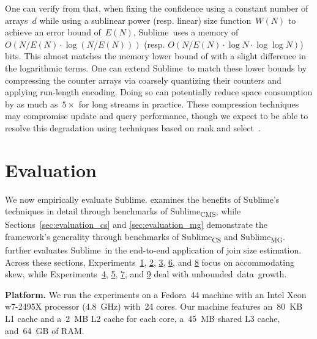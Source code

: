 \documentclass[sigconf]{acmart}
\newcommand{\sketch}{Sublime}
\newcommand{\sketchcms}{\sketch\textsubscript{CMS}\xspace}
\newcommand{\sketchcs}{\sketch\textsubscript{CS}\xspace}
\newcommand{\sketchmg}{\sketch\textsubscript{MG}\xspace}
\begin{document}
One can verify from  that, when
fixing the confidence using a constant number of arrays~$d$ while using a
sublinear power (resp. linear) size function~$W(N)$ to achieve an error bound
of~$E(N)$, \sketch\ uses a memory of~$O(N/E(N) \cdot \log (N/E(N)))$ (resp.
$O(N/E(N) \cdot \log N \cdot \log\log N)$) bits. This almost matches the memory
lower bound of 
with a slight difference in the logarithmic
terms. One can extend \sketch\ to match these lower bounds by compressing the
counter arrays via coarsely quantizing their counters and applying run-length
encoding. Doing so can potentially reduce space consumption by as much
as~$5\times$ for long streams in practice. These compression techniques may
compromise update and query performance, though we expect to be able to resolve
this degradation using techniques based on rank and
select~\cite{Poppy,FlorianRankandSelect,CompactPATTrees,RankandSelectDict,Succincter}.

\section{Evaluation}\label{sec:evaluation}
We now empirically evaluate \sketch.
 examines the benefits of \sketch's techniques in detail through benchmarks of \sketchcms, while Sections~\ref{sec:evaluation_cs} and \ref{sec:evaluation_mg} demonstrate the framework's generality through benchmarks of \sketchcs and \sketchmg.
 further evaluates \sketch\ in the end-to-end application of join size estimation.
Across these sections, Experiments~\hyperlink{experiment:accuracy}{1}, \hyperlink{experiment:skew}{2}, \hyperlink{experiment:vale_tuning}{3}, \hyperlink{experiment:accuracy_unbiased}{6}, and \hyperlink{experiment:accuracy_mg}{8} focus on accommodating skew, while Experiments~\hyperlink{experiment:expansion}{4}, \hyperlink{experiment:contraction}{5}, \hyperlink{experiment:l2_size_function}{7}, and \hyperlink{experiment:expansion_with_decrements}{9} deal with \mbox{unbounded data growth}.

\textbf{Platform.}
We run the experiments on a Fedora~44 machine with an Intel Xeon w7-2495X processor (4.8~GHz) with~24 cores.
Our machine features an~80~KB L1 cache and a~2~MB L2 cache for each core, a~45~MB shared L3 cache, and~64~GB of RAM.
\end{document}
